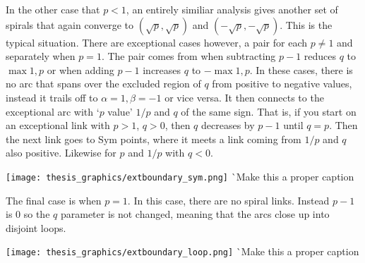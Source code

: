 In the other case that $p<1$, an entirely similiar analysis gives another set of spirals that again converge to $(\sqrt{p},\sqrt{p})$ and $(-\sqrt{p},-\sqrt{p})$. This is the typical situation. There are exceptional cases however, a pair for each $p\neq 1$ and separately when $p=1$. The pair comes from when subtracting $p-1$ reduces $q$ to $\max{1,p}$ or when adding $p-1$ increases $q$ to $-\max{1,p}$. In these cases, there is no arc that spans over the excluded region of $q$ from positive to negative values, instead it trails off to $α=1,β=-1$ or vice versa. It then connects to the exceptional arc with `$p$ value' $1/p$ and $q$ of the same sign. That is, if you start on an exceptional link with $p>1$, $q>0$, then $q$ decreases by $p-1$ until $q=p$. Then the next link goes to Sym points, where it meets a link coming from $1/p$ and $q$ also positive. Likewise for $p$ and $1/p$ with $q<0$.
\begin{center}
\texttt{[image: thesis\_graphics/extboundary\_sym.png]}
^^ Make this a proper caption
\end{center}

The final case is when $p=1$. In this case, there are no spiral links. Instead $p-1$ is $0$ so the $q$ parameter is not changed, meaning that the arcs close up into disjoint loops.
\begin{center}
\texttt{[image: thesis\_graphics/extboundary\_loop.png]}
^^ Make this a proper caption
\end{center}

